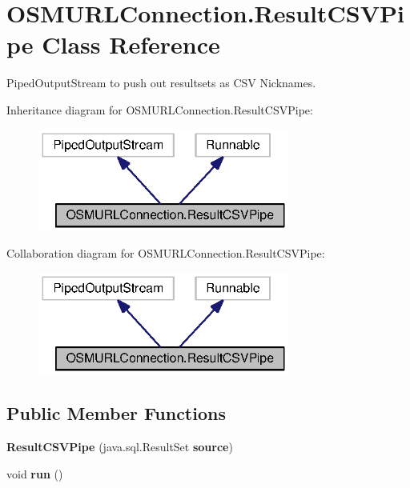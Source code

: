 \section{O\+S\+M\+U\+R\+L\+Connection.\+Result\+C\+S\+V\+Pipe Class Reference}
\label{classorg_1_1smallfoot_1_1parser_1_1osmsql_1_1OSMURLConnection_1_1ResultCSVPipe}


Piped\+Output\+Stream to push out resultsets as C\+S\+V Nicknames.  




Inheritance diagram for O\+S\+M\+U\+R\+L\+Connection.\+Result\+C\+S\+V\+Pipe\+:\nopagebreak
\begin{figure}[H]
\begin{center}
\leavevmode
\includegraphics[width=234pt]{classorg_1_1smallfoot_1_1parser_1_1osmsql_1_1OSMURLConnection_1_1ResultCSVPipe__inherit__graph}
\end{center}
\end{figure}


Collaboration diagram for O\+S\+M\+U\+R\+L\+Connection.\+Result\+C\+S\+V\+Pipe\+:\nopagebreak
\begin{figure}[H]
\begin{center}
\leavevmode
\includegraphics[width=234pt]{classorg_1_1smallfoot_1_1parser_1_1osmsql_1_1OSMURLConnection_1_1ResultCSVPipe__coll__graph}
\end{center}
\end{figure}
\subsection*{Public Member Functions}
\begin{DoxyCompactItemize}
\item 
{\bf Result\+C\+S\+V\+Pipe} (java.\+sql.\+Result\+Set {\bf source})
\item 
void {\bf run} ()
\end{DoxyCompactItemize}
